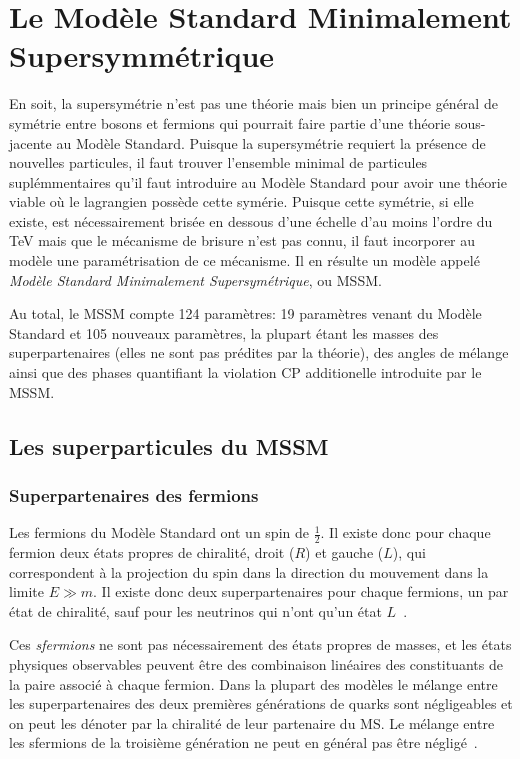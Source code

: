 \section{Le Modèle Standard Minimalement Supersymmétrique}
\label{sec:susy:mssm}

En soit, la supersymétrie n'est pas une théorie mais bien un principe
général de symétrie entre bosons et fermions qui pourrait faire partie
d'une théorie sous-jacente au Modèle Standard. Puisque la
supersymétrie requiert la présence de nouvelles particules, il faut
trouver l'ensemble minimal de particules suplémmentaires qu'il faut
introduire au Modèle Standard pour avoir une théorie viable où le
lagrangien possède cette symérie. Puisque cette symétrie, si elle
existe, est nécessairement brisée en dessous d'une échelle d'au moins
l'ordre du TeV mais que le mécanisme de brisure n'est pas connu, il
faut incorporer au modèle une paramétrisation de ce mécanisme. Il en
résulte un modèle appelé \emph{Modèle Standard Minimalement
  Supersymétrique}, ou MSSM. 

Au total, le MSSM compte 124 paramètres: 19 paramètres venant du
Modèle Standard et 105 nouveaux paramètres, la plupart étant les
masses des superpartenaires (elles ne sont pas prédites par la
théorie), des angles de mélange ainsi que des phases quantifiant la
violation CP additionelle introduite par le MSSM.

\subsection{Les superparticules du MSSM}
\label{sec:susy:mssm:sparticules}

\subsubsection{Superpartenaires des fermions}

Les fermions du Modèle Standard ont un spin de $\frac{1}{2}$. Il
existe donc pour chaque fermion deux états propres de chiralité, droit
($R$) et gauche ($L$), qui correspondent à la projection du spin dans
la direction du mouvement dans la limite $E \gg m$. Il existe donc
deux superpartenaires pour chaque fermions, un par état de chiralité,
sauf pour les neutrinos qui n'ont qu'un état $L$~\cite{thomson_modern_2013}.

Ces \emph{sfermions} ne sont pas nécessairement des états propres de
masses, et les états physiques observables peuvent être des
combinaison linéaires des constituants de la paire associé à chaque
fermion. Dans la plupart des modèles le mélange entre les
superpartenaires des deux premières générations de quarks sont
négligeables et on peut les dénoter par la chiralité de leur
partenaire du MS. Le mélange entre les sfermions de la troisième
génération ne peut en général pas être
négligé~\cite{aad_summary_2015}.

